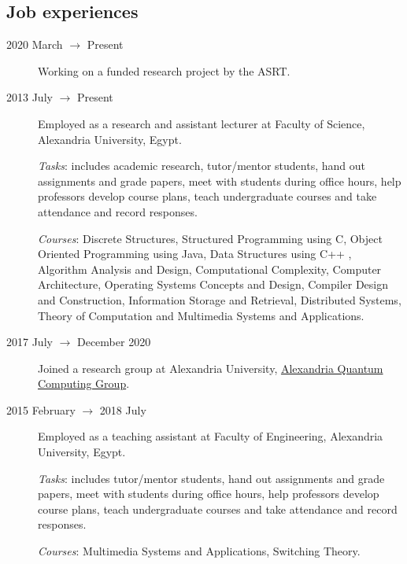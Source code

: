\documentclass[margin,line,a4paper]{resume}
\begin{document}
\begin{resume}
\section{\mysidestyle Job experiences}\vspace{1mm}
\begin{description}
    

    \item[2020 March $\rightarrow$ Present] Working on a funded research project by the ASRT.

    
    \item[2013 July $\rightarrow$ Present] Employed as a research and assistant lecturer at Faculty of Science, Alexandria University, Egypt. 
    
    \emph{Tasks}: includes academic research, tutor/mentor students, hand out assignments and grade papers, meet with students during office hours, help professors develop course plans, teach undergraduate courses and take attendance and record responses.
       
    \emph{Courses}: Discrete Structures, Structured Programming using C, Object Oriented Programming using Java, Data Structures using C++ , Algorithm Analysis and Design, Computational Complexity, Computer Architecture, Operating Systems Concepts and Design, Compiler Design and Construction, Information Storage and Retrieval, Distributed Systems, Theory of Computation and Multimedia Systems and Applications.
    
        
	\item[2017 July $\rightarrow$ December 2020 ]  Joined a research group at Alexandria University, \href{http://www.sci.p.alexu.edu.eg/~aleqcg/index.html}{Alexandria Quantum Computing Group}.
    

        

	\item[2015 February $\rightarrow$ 2018 July] Employed as a teaching assistant at Faculty of Engineering, Alexandria University, Egypt. 
	
	\emph{Tasks}: includes tutor/mentor students, hand out assignments and grade papers, meet with students during office hours, help professors develop course plans, teach undergraduate courses and take attendance and record responses.        
    
	\emph{Courses}: Multimedia Systems and Applications, Switching Theory.
    
 
    



\end{description}
\end{resume}
\end{document}
